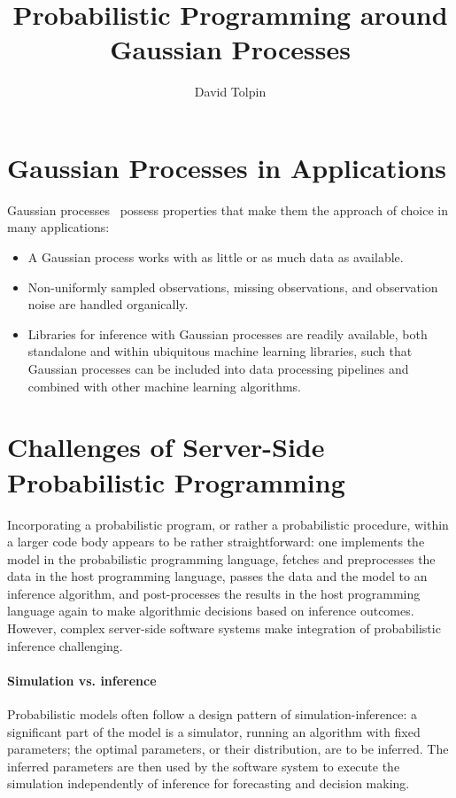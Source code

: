 \documentclass[sigplan,review]{acmart}\settopmatter{printfolios=true,printccs=false,printacmref=false}
\title{Probabilistic Programming around Gaussian Processes}
\author{David Tolpin}
\affiliation{
    \institution{PUB+}
    \country{Israel}
}
\begin{document}
\maketitle

\begin{sloppypar}
	\section{Gaussian Processes in Applications}

	Gaussian processes~\cite{} possess properties that make
	them the approach of choice in many applications:
	\begin{itemize}
		\item A Gaussian process works with as little or as much
			data as available.
		\item Non-uniformly sampled observations, missing
			observations, and observation noise are handled
			organically.
		\item Libraries for inference with Gaussian processes
			are readily available, both standalone and within
			ubiquitous machine learning libraries, such that
			Gaussian processes can be included into data
			processing pipelines and combined with other machine
			learning algorithms.
	\end{itemize}
			

	


\section{Challenges of Server-Side Probabilistic Programming}

Incorporating a probabilistic program, or rather a probabilistic
procedure, within a larger code body appears to be rather
straightforward: one implements the model in the probabilistic
programming language, fetches and preprocesses the data in the
host programming language, passes the data and the model to an
inference algorithm, and post-processes the results in the
host programming language again to make algorithmic
decisions based on inference outcomes. However, complex
server-side software systems make integration of probabilistic
inference challenging. 

\paragraph{Simulation vs. inference} Probabilistic models
often follow a design pattern of simulation-inference: a
significant part of the model is a simulator, running an
algorithm with fixed parameters; the optimal parameters, or
their distribution, are to be inferred. The inferred parameters
are then used by the software system to execute the simulation
independently of inference for forecasting and decision making.


\end{sloppypar}
\end{document}
